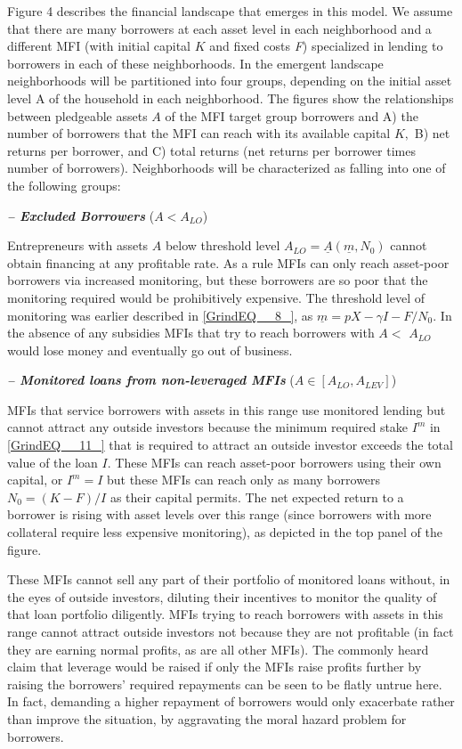\documentclass{article} %
\begin{document}
Figure 4 describes the financial landscape that emerges in this model.  We assume that there are many borrowers at each asset level in each neighborhood and a different MFI (with initial capital $K$ and fixed costs \textit{F}) specialized in lending to borrowers in each of these neighborhoods.  In the emergent landscape neighborhoods will be partitioned into four groups, depending on the initial asset level A of the household in each neighborhood.  The figures show the relationships between pledgeable assets $A$ of the MFI target group borrowers and A) the number of borrowers that the MFI can reach with its available capital $K,$ B) net returns per borrower, and C) total returns (net returns per borrower times number of borrowers).  Neighborhoods will be characterized as falling into one of the following groups: 

\noindent \textbf{\textit{ -- Excluded Borrowers}} ($A<A_{LO} $) 

Entrepreneurs with assets $A$ below threshold level $A_{LO} =\underline{A}(\underline{m},N_{0} )$ cannot obtain financing at any profitable rate. As a rule MFIs can only reach asset-poor borrowers via increased monitoring, but these borrowers are so poor that the monitoring required would be prohibitively expensive. The threshold level of monitoring was earlier described in \eqref{GrindEQ__8_}, as $\underline{m}=pX-\gamma I-F/N_{0} .$  In the absence of any subsidies MFIs that try to reach borrowers with $A<$ $A_{LO} $ would lose money and eventually go out of business. 

\noindent \textbf{\textit{ -- Monitored loans from non-leveraged MFIs}} ($A\in [A_{LO} ,A_{LEV} ]$) 

MFIs that service borrowers with assets in this range use monitored lending but cannot attract any outside investors because the minimum required stake $I^{m} $ in \eqref{GrindEQ__11_} that is required to attract an outside investor exceeds the total value of the loan $I$.  These MFIs can reach asset-poor borrowers using their own capital, or $I^{m} =I$ but these MFIs can reach only as many borrowers $N_{0} =(K-F)/I$ as their capital permits.   The net expected return to a borrower is rising with asset levels over this range (since borrowers with more collateral require less expensive monitoring), as depicted in the top panel of the figure. 

These MFIs cannot sell any part of their portfolio of monitored loans without, in the eyes of outside investors, diluting their incentives to monitor the quality of that loan portfolio diligently.  MFIs trying to reach borrowers with assets in this range cannot attract outside investors not because they are not profitable (in fact they are earning normal profits, as are all other MFIs).  The commonly heard claim that leverage would be raised if only the MFIs raise profits further by raising the borrowers' required repayments can be seen to be flatly untrue here. In fact, demanding a higher repayment of borrowers would only exacerbate rather than improve the situation, by aggravating the moral hazard problem for borrowers. 
\end{document}

